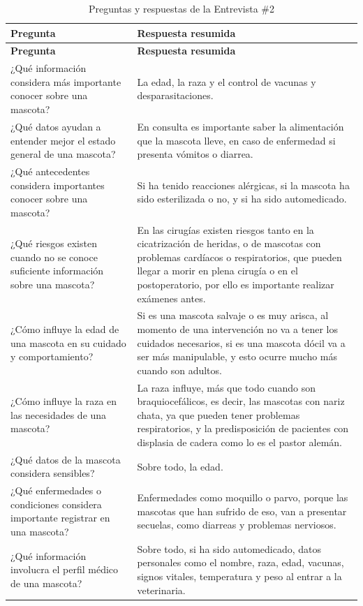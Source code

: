 \documentclass[journal,onecolumn]{IEEEtran}
\begin{document}
\begin{longtable}{|p{7.5cm}|p{7.5cm}|}
\caption{Preguntas y respuestas de la Entrevista \#2}
\label{tab:pr_e2}\\
\hline
\textbf{Pregunta} & \textbf{Respuesta resumida} \\
\hline
\endfirsthead
\hline
\textbf{Pregunta} & \textbf{Respuesta resumida} \\
\hline
\endhead
¿Qué información considera más importante conocer sobre una mascota? & La edad, la raza y el control de vacunas y desparasitaciones. \\
\hline
¿Qué datos ayudan a entender mejor el estado general de una mascota? & En consulta es importante saber la alimentación que la mascota lleve, en caso de enfermedad si presenta vómitos o diarrea. \\
\hline
¿Qué antecedentes considera importantes conocer sobre una mascota? & Si ha tenido reacciones alérgicas, si la mascota ha sido esterilizada o no, y si ha sido automedicado. \\
\hline
¿Qué riesgos existen cuando no se conoce suficiente información sobre una mascota? & En las cirugías existen riesgos tanto en la cicatrización de heridas, o de mascotas con problemas cardíacos o respiratorios, que pueden llegar a morir en plena cirugía o en el postoperatorio, por ello es importante realizar exámenes antes. \\
\hline
¿Cómo influye la edad de una mascota en su cuidado y comportamiento? & Si es una mascota salvaje o es muy arisca, al momento de una intervención no va a tener los cuidados necesarios, si es una mascota dócil va a ser más manipulable, y esto ocurre mucho más cuando son adultos. \\
\hline
¿Cómo influye la raza en las necesidades de una mascota? & La raza influye, más que todo cuando son braquiocefálicos, es decir, las mascotas con nariz chata, ya que pueden tener problemas respiratorios, y la predisposición de pacientes con displasia de cadera como lo es el pastor alemán. \\
\hline
¿Qué datos de la mascota considera sensibles? & Sobre todo, la edad. \\
\hline
¿Qué enfermedades o condiciones considera importante registrar en una mascota? & Enfermedades como moquillo o parvo, porque las mascotas que han sufrido de eso, van a presentar secuelas, como diarreas y problemas nerviosos. \\
\hline
¿Qué información involucra el perfil médico de una mascota? & Sobre todo, si ha sido automedicado, datos personales como el nombre, raza, edad, vacunas, signos vitales, temperatura y peso al entrar a la veterinaria. \\

\end{longtable}
\end{document}
